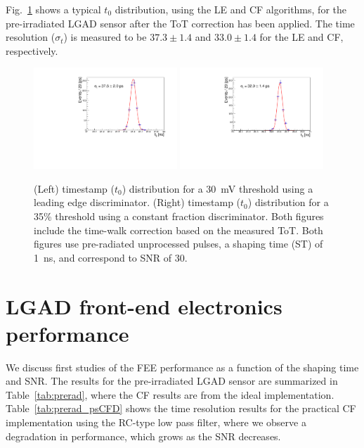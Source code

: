 \documentclass[preprint,1p]{elsarticle}
\begin{document}
Fig.~\ref{fig:time_res} shows a typical $t_{0}$ distribution, using the LE and CF algorithms, for the pre-irradiated
LGAD sensor after the ToT correction has been applied. The time resolution ($\sigma_{t}$) is measured to be $37.3 \pm 1.4 $
and $33.0 \pm 1.4$ for the LE and CF, respectively.

  \begin{figure}[htbp]
    \centering
    \includegraphics[width=0.48\textwidth]{figs/pre_rad_st_1ns_snr_30_le_tot_threshold_30mV.pdf} \hfill
    \includegraphics[width=0.48\textwidth]{figs/pre_rad_st_1ns_snr_30_cfd_tot_threshold_35_percent_v2.pdf}
    \caption{(Left) timestamp ($t_{0}$) distribution for a 30~\si{mV} threshold using a leading edge discriminator.
    (Right) timestamp ($t_{0}$) distribution for a 35\% threshold using a constant fraction discriminator. Both figures
    include the time-walk correction based on the measured ToT.
    Both figures use pre-radiated unprocessed pulses, a shaping time (ST) of 1~\si{ns}, and correspond to SNR of 30.}
    \label{fig:time_res}
  \end{figure}



\section{LGAD front-end electronics performance}\label{sec:results}

We discuss first studies of the FEE performance as a function of the shaping time and SNR.
The results for the pre-irradiated LGAD sensor are summarized in Table~\ref{tab:prerad},
where the CF results are from the ideal implementation.  Table~\ref{tab:prerad_psCFD}
shows the time resolution results for the practical CF implementation using the RC-type low pass filter,
where we observe a degradation in performance, which grows as the SNR decreases.
\end{document}
